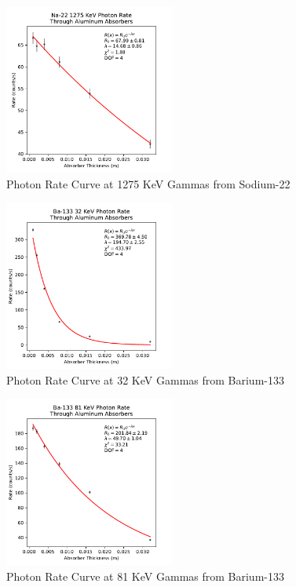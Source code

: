 \documentclass[12pt, letterpaper]{article}
\begin{document}
\begin{figure}[h]
    \centering
    \includegraphics[width=0.5\textwidth]{experiment1/figures/na22/rates-1275.pdf}
    \caption{Photon Rate Curve at 1275 KeV Gammas from Sodium-22}
    \label{fig:rates1275}
\end{figure}

\begin{figure}[h]
    \centering
    \includegraphics[width=0.5\textwidth]{experiment1/figures/ba133/rates-32.pdf}
    \caption{Photon Rate Curve at 32 KeV Gammas from Barium-133}
    \label{fig:rates32}
\end{figure}

\begin{figure}[h]
    \centering
    \includegraphics[width=0.5\textwidth]{experiment1/figures/ba133/rates-81.pdf}
    \caption{Photon Rate Curve at 81 KeV Gammas from Barium-133}
    \label{fig:rates81}
\end{figure}
\end{document}
